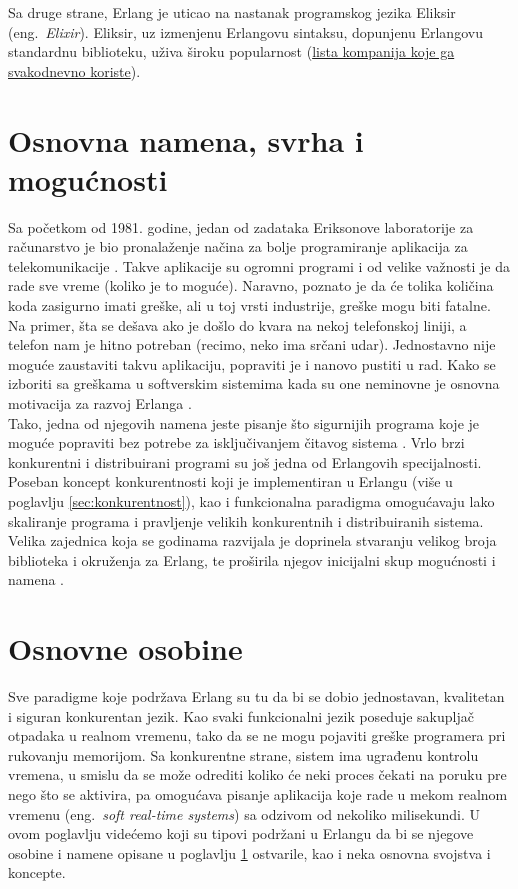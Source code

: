 \documentclass[a4paper]{article}
\begin{document}
Sa druge strane, Erlang je uticao na nastanak programskog jezika Eliksir (eng.~{\em Elixir}). Eliksir,
uz izmenjenu Erlangovu sintaksu, dopunjenu Erlangovu standardnu biblioteku, uživa široku popularnost 
(\href{https://elixir-companies.com/}{lista kompanija koje ga svakodnevno koriste}). 

\section{Osnovna namena, svrha i mogućnosti}
\label{sec:namena}
Sa početkom od 1981. godine, jedan od zadataka Eriksonove laboratorije za računarstvo je bio pronalaženje načina za bolje programiranje aplikacija
za telekomunikacije \cite{phdthesis}. Takve aplikacije su ogromni programi i od velike važnosti je da rade sve vreme (koliko je to moguće). 
Naravno, poznato je da će tolika količina koda zasigurno imati greške, ali u toj vrsti industrije, greške mogu biti fatalne. Na primer, 
šta se dešava ako je došlo do kvara na nekoj telefonskoj liniji, a telefon nam je hitno potreban (recimo, neko ima srčani udar).
Jednostavno nije moguće zaustaviti takvu aplikaciju, popraviti je i nanovo pustiti u rad.
Kako se izboriti sa greškama u softverskim sistemima kada su one neminovne je osnovna motivacija za razvoj Erlanga \cite{phdthesis}. \\

Tako, jedna od njegovih namena jeste pisanje što sigurnijih programa koje je moguće popraviti bez potrebe za isključivanjem čitavog sistema \cite{book_joe}.
Vrlo brzi konkurentni i distribuirani programi su još jedna od Erlangovih specijalnosti. 
Poseban koncept konkurentnosti koji je implementiran u Erlangu (više u poglavlju \ref{sec:konkurentnost}), kao i funkcionalna paradigma 
omogućavaju lako skaliranje programa i pravljenje velikih konkurentnih i distribuiranih sistema.
Velika zajednica koja se godinama razvijala je doprinela stvaranju velikog broja biblioteka i okruženja za Erlang, te proširila njegov 
inicijalni skup mogućnosti i namena \cite{book_joe}. 


\section{Osnovne osobine}
\label{sec:osobine}
Sve paradigme koje podržava Erlang su tu da bi se dobio jednostavan, kvalitetan i
siguran konkurentan jezik.
Kao svaki funkcionalni jezik poseduje sakupljač otpadaka \cite{book_concurrent} u realnom vremenu, tako da se ne mogu pojaviti greške programera pri rukovanju memorijom. 
Sa konkurentne strane, sistem ima ugrađenu kontrolu vremena, 
u smislu da se može odrediti koliko će neki proces čekati na poruku pre nego što se aktivira, 
pa omogućava pisanje aplikacija koje rade u mekom realnom vremenu (eng.~{\em soft real-time systems}) \cite{book_concurrent} sa odzivom od nekoliko milisekundi. 
U ovom poglavlju videćemo koji su tipovi podržani u Erlangu da bi se njegove osobine i namene opisane u poglavlju \ref{sec:namena} ostvarile, 
kao i neka osnovna svojstva i koncepte.
\end{document}
